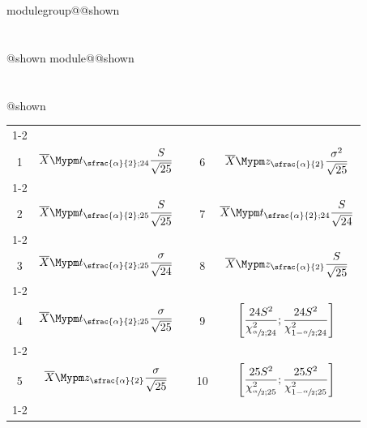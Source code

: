 \documentclass{Evaluation}
\makeatletter
\newcommand{\currentmodulekey}{}
\newcommand{\currentmoduletitle}{}
\newcommand{\currentgroupkey}{}
\newcommand{\currentgrouptitle}{}
\newcommand{\showmoduleifneeded}{%
  \ifx\currentgroupkey\empty\else
    \expandafter\ifx\csname modulegroup@\currentgroupkey @shown\endcsname\relax
      \section*{\currentgrouptitle}%
      \expandafter\gdef\csname modulegroup@\currentgroupkey @shown\endcsname{1}%
    \fi
  \fi
  \expandafter\ifx\csname module@\currentmodulekey @shown\endcsname\relax
    \section*{\currentmoduletitle}%
    \expandafter\gdef\csname module@\currentmodulekey @shown\endcsname{1}%
  \fi
}
\newenvironment{H24}{\showmoduleifneeded}{}
\makeatother
\begin{document}
\begin{questions}
\begin{H24}
\begin{center}
\begin{tabular}{|c|c|c|c|c|}
	\cline{1-2}\cline{4-5}
	&&&&\\[-3mm]
	1 &  $\displaystyle \overline {X}\Mypm t_{\sfrac{\alpha}{2};24}\frac{S}{\sqrt{25}}$
	 & \hspace{0.3cm} &
	 6 &  $\displaystyle \overline {X}\Mypm z_{\sfrac{\alpha}{2}}\frac{\sigma^2}{\sqrt{25}}$
	\\[4mm]
	\cline{1-2}\cline{4-5}
	&&&&\\[-3mm]
	 2 & $\displaystyle \overline {X}\Mypm t_{\sfrac{\alpha}{2};25}\frac{S}{\sqrt{25}}$
	&  &
	 7 & $\displaystyle \overline {X}\Mypm t_{\sfrac{\alpha}{2};24}\frac{S}{\sqrt{24}}$
	\\[4mm]
	\cline{1-2}\cline{4-5}
	&&&&\\[-3mm]
	 3 & $\displaystyle \overline {X}\Mypm t_{\sfrac{\alpha}{2};25}\frac{\sigma}{\sqrt{24}}$
	 &  &
	  8 & $\displaystyle \overline {X}\Mypm z_{\sfrac{\alpha}{2}}\frac{S}{\sqrt{25}}$
	 \\[4mm]
	 \cline{1-2}\cline{4-5}
	 &&&&\\[-3mm]
	   4 & $\displaystyle \overline {X}\Mypm t_{\sfrac{\alpha}{2};25}\frac{\sigma}{\sqrt{25}}$
	 &  &
	  9 & $\displaystyle \left[\frac{24S^2}{\chi_{\sfrac{\alpha}{2};24}^2};\frac{24S^2}{\chi_{1-\sfrac{\alpha}{2};24}^2}\right]$
	 \\[5mm]
	 \cline{1-2}\cline{4-5}
	 &&&&\\[-3mm]
	  5 & $\displaystyle \overline {X}\Mypm z_{\sfrac{\alpha}{2}}\frac{\sigma}{\sqrt{25}}$
	 &  &
	  10 & $\displaystyle \left[\frac{25S^2}{\chi_{\sfrac{\alpha}{2};25}^2};\frac{25S^2}{\chi_{1-\sfrac{\alpha}{2};25}^2}\right]$
	 \\[5mm]
	 \cline{1-2}\cline{4-5}


\end{tabular}

\end{center}


\end{H24}
\end{questions}
\end{document}
